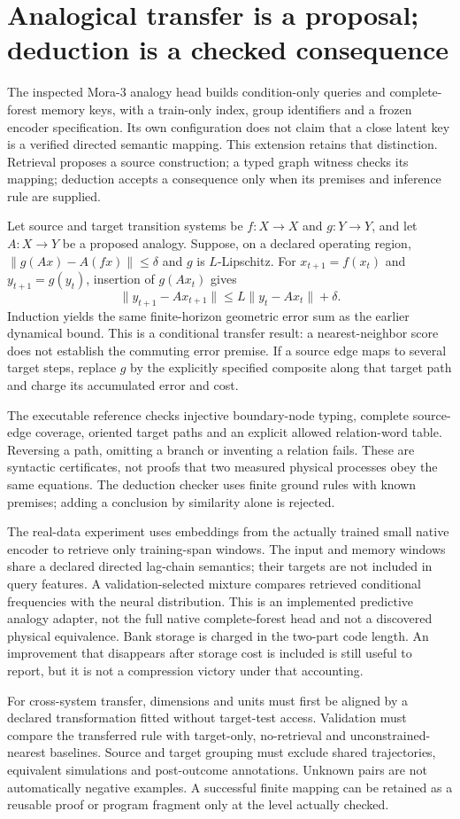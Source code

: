 \section{Analogical transfer is a proposal; deduction is a checked consequence}
\label{sec:wb-analogy}

The inspected Mora-3 analogy head builds condition-only queries and complete-forest memory keys, with a train-only index, group identifiers and a frozen encoder specification. Its own configuration does not claim that a close latent key is a verified directed semantic mapping. This extension retains that distinction. Retrieval proposes a source construction; a typed graph witness checks its mapping; deduction accepts a consequence only when its premises and inference rule are supplied.

Let source and target transition systems be $f:X\to X$ and $g:Y\to Y$, and let $A:X\to Y$ be a proposed analogy. Suppose, on a declared operating region, $\|g(Ax)-A(fx)\|\le\delta$ and $g$ is $L$-Lipschitz. For $x_{t+1}=f(x_t)$ and $y_{t+1}=g(y_t)$, insertion of $g(Ax_t)$ gives
\[
 \|y_{t+1}-Ax_{t+1}\|\le L\|y_t-Ax_t\|+\delta.
\]
Induction yields the same finite-horizon geometric error sum as the earlier dynamical bound. This is a conditional transfer result: a nearest-neighbor score does not establish the commuting error premise. If a source edge maps to several target steps, replace $g$ by the explicitly specified composite along that target path and charge its accumulated error and cost.

The executable reference checks injective boundary-node typing, complete source-edge coverage, oriented target paths and an explicit allowed relation-word table. Reversing a path, omitting a branch or inventing a relation fails. These are syntactic certificates, not proofs that two measured physical processes obey the same equations. The deduction checker uses finite ground rules with known premises; adding a conclusion by similarity alone is rejected.

The real-data experiment uses embeddings from the actually trained small native encoder to retrieve only training-span windows. The input and memory windows share a declared directed lag-chain semantics; their targets are not included in query features. A validation-selected mixture compares retrieved conditional frequencies with the neural distribution. This is an implemented predictive analogy adapter, not the full native complete-forest head and not a discovered physical equivalence. Bank storage is charged in the two-part code length. An improvement that disappears after storage cost is included is still useful to report, but it is not a compression victory under that accounting.

For cross-system transfer, dimensions and units must first be aligned by a declared transformation fitted without target-test access. Validation must compare the transferred rule with target-only, no-retrieval and unconstrained-nearest baselines. Source and target grouping must exclude shared trajectories, equivalent simulations and post-outcome annotations. Unknown pairs are not automatically negative examples. A successful finite mapping can be retained as a reusable proof or program fragment only at the level actually checked.
